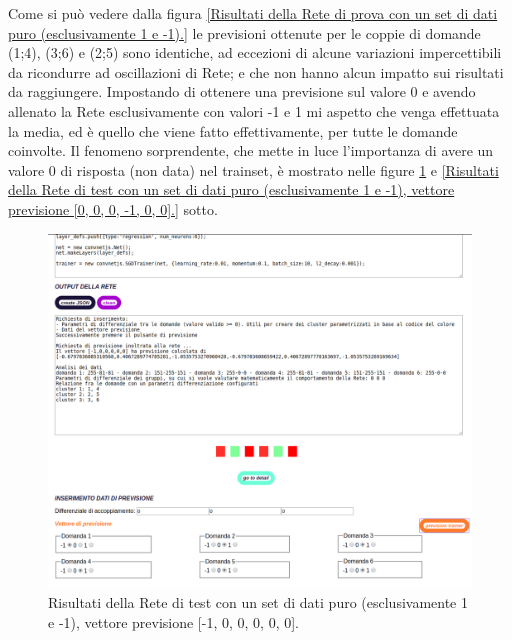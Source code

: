 	\noindent
Come si pu\`o vedere dalla figura \ref{Risultati della Rete di prova con un set di dati puro (esclusivamente 1 e -1).} le previsioni ottenute per le coppie di domande (1;4), (3;6) e (2;5) sono identiche, ad eccezioni di alcune variazioni impercettibili da ricondurre ad oscillazioni di Rete; e che non hanno alcun impatto sui risultati da raggiungere. Impostando di ottenere una previsione sul valore 0 e avendo allenato la Rete esclusivamente con valori -1 e 1 mi aspetto che venga effettuata la media, ed \`e quello che viene fatto effettivamente, per tutte le domande coinvolte.
Il fenomeno sorprendente, che mette in luce l'importanza di avere un valore 0 di risposta (non data) nel trainset, \`e mostrato nelle figure \ref{Risultati della Rete di test con un set di dati puro (esclusivamente 1 e -1), vettore previsione [-1, 0, 0, 0, 0, 0].} e  \ref{Risultati della Rete di test con un set di dati puro (esclusivamente 1 e -1), vettore previsione [0, 0, 0, -1, 0, 0].} sotto.
\begin{figure}[H]
\centering
	\includegraphics[width=1\linewidth]{./image/RetediProva_generatorinputpuro1.png}
	\caption{Risultati della Rete di test con un set di dati puro (esclusivamente 1 e -1), vettore previsione [-1, 0, 0, 0, 0, 0].}
	\label{Risultati della Rete di test con un set di dati puro (esclusivamente 1 e -1), vettore previsione [-1, 0, 0, 0, 0, 0].}
\end{figure}
\noindent

